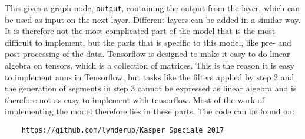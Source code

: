This gives a graph node, \texttt{output}, containing the output from the  layer, which can be used
as input on the next layer. Different layers can be added in a similar way. It is therefore not 
the most complicated part of the model that is the most difficult to implement, but the parts
that is specific to this model, like pre- and post-processing of the data. Tensorflow is designed 
to make it easy to do linear algebra on tensors, which is a collection of matrices. This is the 
reason it is easy to implement \glspl{ann} in Tensorflow, but tasks like the filters applied by 
step 2 and the generation of segments in step 3 cannot be expressed as linear algebra and is 
therefore not as easy to implement with tensorflow. Most of the work of implementing the model
therefore lies in these parts. 
The code can be found on:
\begin{verbatim}
	https://github.com/lynderup/Kasper_Speciale_2017
\end{verbatim}


